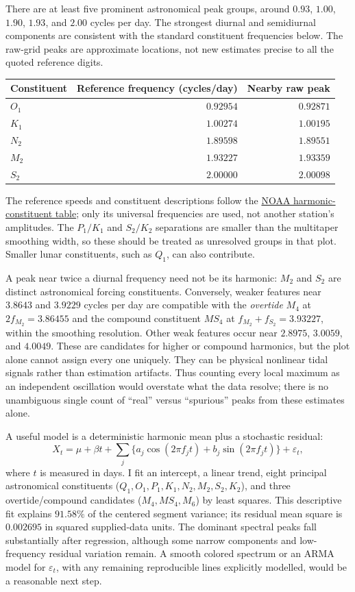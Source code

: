 \documentclass[lang=en,11pt,a4paper,citestyle =authoryear,nobib=true]{elegantpaper}
\begin{document}
\begin{enumerate}[label=\arabic*.,leftmargin=*]
There are at least five prominent astronomical peak groups, around $0.93$,
$1.00$, $1.90$, $1.93$, and $2.00$ cycles per day. The strongest diurnal and
semidiurnal components are consistent with the standard constituent
frequencies below. The raw-grid peaks are approximate locations, not
new estimates precise to all the quoted reference digits.
\begin{center}
\begin{tabular}{lrr}
\hline
Constituent & Reference frequency (cycles/day) & Nearby raw peak \\
\hline
$O_1$ & $0.92954$ & $0.92871$ \\
$K_1$ & $1.00274$ & $1.00195$ \\
$N_2$ & $1.89598$ & $1.89551$ \\
$M_2$ & $1.93227$ & $1.93359$ \\
$S_2$ & $2.00000$ & $2.00098$ \\
\hline
\end{tabular}
\end{center}
The reference speeds and constituent descriptions follow the
\href{https://tidesandcurrents.noaa.gov/harcon.html?id=8721120}{NOAA harmonic-constituent table};
only its universal frequencies are used, not another station's amplitudes.
The $P_1/K_1$ and $S_2/K_2$ separations are smaller than the multitaper
smoothing width, so these should be treated as unresolved groups in that
plot. Smaller lunar constituents, such as $Q_1$, can also contribute.

A peak near twice a diurnal frequency need not be its harmonic: $M_2$ and
$S_2$ are distinct astronomical forcing constituents. Conversely, weaker
features near $3.8643$ and $3.9229$ cycles per day are compatible with the
\emph{overtide} $M_4$ at $2f_{M_2}=3.86455$ and the compound constituent $MS_4$
at $f_{M_2}+f_{S_2}=3.93227$, within the smoothing resolution. Other weak
features occur near $2.8975$, $3.0059$, and $4.0049$. These are candidates
for higher or compound harmonics, but the plot alone cannot assign every
one uniquely. They can be physical nonlinear tidal signals rather than
estimation artifacts. Thus counting every local maximum as an independent
oscillation would overstate what the data resolve; there is no unambiguous
single count of ``real'' versus ``spurious'' peaks from these estimates alone.

A useful model is a deterministic harmonic mean plus a stochastic residual:
\[
X_t=\mu+\beta t+\sum_j\{a_j\cos(2\pi f_jt)+b_j\sin(2\pi f_jt)\}
+\varepsilon_t,
\]
where $t$ is measured in days. I fit an intercept, a linear trend, eight
principal astronomical constituents ($Q_1,O_1,P_1,K_1,N_2,M_2,S_2,K_2$),
and three overtide/compound candidates ($M_4,MS_4,M_6$) by least squares.
This descriptive fit explains $91.58\%$ of the centered segment variance;
its residual mean square is $0.002695$ in squared supplied-data units.
The dominant spectral peaks fall substantially after regression, although
some narrow components and low-frequency residual variation remain.
A smooth colored spectrum or an ARMA model for $\varepsilon_t$, with any
remaining reproducible lines explicitly modelled, would be a reasonable
next step.


\end{enumerate}
\end{document}
